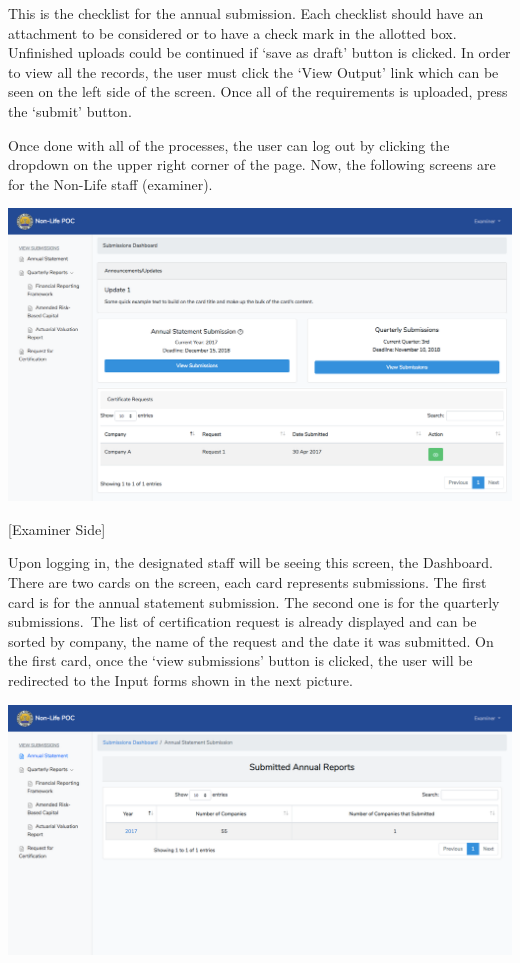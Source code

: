 \documentclass{article}
\begin{document}
This is the checklist for the annual submission. Each
checklist should have an attachment to be considered or to have a check
mark in the allotted box. Unfinished uploads could be continued if ‘save
as draft’ button is clicked. In order to view all the records, the user
must click the ‘View Output’ link which can be seen on the left side of
the screen. Once all of the requirements is uploaded, press the ‘submit’
button.%

Once done with all of the processes, the user can log
out by clicking the dropdown on the upper right corner of the page. Now,
the following screens are for the Non-Life staff (examiner).%

\includegraphics[keepaspectratio=true]{up-ic-screens/image2}{}%

[Examiner Side]%

Upon logging in, the designated staff will be seeing
this screen, the Dashboard. There are two cards on the screen, each card
represents submissions. The first card is for the annual statement submission. The
second one is for the quarterly
submissions. The list of certification request
is already displayed and can be sorted by company, the name of the
request and the date it was submitted. On the first card, once the ‘view
submissions’ button is clicked, the user will be redirected to the Input
forms shown in the next picture.%

\includegraphics[keepaspectratio=true]{up-ic-screens/image84}{}%
\end{document}
